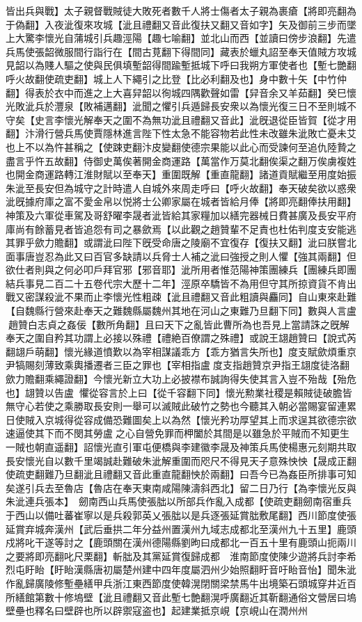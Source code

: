 皆出兵與戰】太子親督戰賊徒大敗死者數千人將士傷者太子親為裹瘡【將即亮翻為于偽翻】入夜泚復來攻城【泚且禮翻又音此復扶又翻又音如字】矢及御前三步而墜上大驚李懷光自蒲城引兵趣涇陽【趣七喻翻】並北山而西【並讀曰傍步浪翻】先遣兵馬使張韶微服間行詣行在【間古莧翻下得間同】藏表於蠟丸詔至奉天值賊方攻城見韶以為賤人驅之使與民俱填塹韶得間踰塹抵城下呼曰我朔方軍使者也【塹七艷翻呼火故翻使疏吏翻】城上人下繩引之比登【比必利翻及也】身中數十矢【中竹仲翻】得表於衣中而進之上大喜舁韶以徇城四隅歡聲如雷【舁音余又羊茹翻】癸巳懷光敗泚兵於灃泉【敗補邁翻】泚聞之懼引兵遁歸長安衆以為懷光復三日不至則城不守矣【史言李懷光解奉天之圍不為無功泚且禮翻又音此】泚旣退從臣皆賀【從才用翻】汴滑行營兵馬使賈隱林進言陛下性太急不能容物若此性未改雖朱泚敗亡憂未艾也上不以為忤甚稱之【使踈吏翻汴皮變翻使德宗果能以此心而受諫何至追仇陸贄之盡言乎忤五故翻】侍御史萬俟著開金商運路【萬當作万莫北翻俟渠之翻万俟虜複姓也開金商運路轉江淮財賦以至奉天】重圍既解【重直龍翻】諸道貢賦繼至用度始振朱泚至長安但為城守之計時遣人自城外來周走呼曰【呼火故翻】奉天破矣欲以惑衆泚旣據府庫之富不愛金帛以悦將士公卿家屬在城者皆給月俸【將即亮翻俸扶用翻】神策及六軍從車駕及哥舒曜李晟者泚皆給其家糧加以繕完器械日費甚廣及長安平府庫尚有餘蓄見者皆追怨有司之暴歛焉【以此觀之趙贊輩不足責也杜佑判度支安能逃其罪乎歛力贍翻】或謂泚曰陛下旣受命唐之陵廟不宜復存【復扶又翻】泚曰朕嘗北面事唐豈忍為此又曰百官多缺請以兵脅士人補之泚曰強授之則人懼【強其兩翻】但欲仕者則與之何必叩戶拜官邪【邪音耶】泚所用者惟范陽神策團練兵【團練兵即團結兵事見二百二十五卷代宗大歷十二年】涇原卒驕皆不為用但守其所掠資貨不肯出戰又密謀殺泚不果而止李懷光性粗疎【泚且禮翻又音此粗讀與麤同】自山東來赴難【自魏縣行營來赴奉天之難魏縣屬魏州其地在河山之東難乃旦翻下同】數與人言盧趙贊白志貞之姦佞【數所角翻】且曰天下之亂皆此曹所為也吾見上當請誅之旣解奉天之圍自矜其功謂上必接以殊禮【禮絶百僚謂之殊禮】或說王翃趙贊曰【說式芮翻翃戶萌翻】懷光緣道憤歎以為宰相謀議乖方【乖方猶言失所也】度支賦歛煩重京尹犒賜刻薄致乘輿播遷者三臣之罪也【宰相指盧度支指趙贊京尹指王翃度徒洛翻歛力贍翻乘繩證翻】今懷光新立大功上必披襟布誠詢得失使其言入豈不殆哉【殆危也】翃贊以告盧懼從容言於上曰【從千容翻下同】懷光勲業社稷是賴賊徒破膽皆無守心若使之乘勝取長安則一舉可以滅賊此破竹之勢也今聽其入朝必當賜宴留連累日使賊入京城得從容成備恐難圖矣上以為然【懷光矜功厚望其上而求逞其欲德宗欲速逼使其下而不閔其勞盧之心自營免罪而柙闔於其間是以雖急於平賊而不知更生一賊也朝直遥翻】詔懷光直引軍屯便橋與李建徽李晟及神策兵馬使楊惠元刻期共取長安懷光自以數千里竭誠赴難破朱泚解重圍而咫尺不得見天子意殊怏怏【晟成正翻使疏吏翻難乃旦翻泚且禮翻又音此重直龍翻怏於兩翻】曰吾今已為姦臣所排事可知矣遂引兵去至魯店【魯店在奉天東南咸陽陳濤斜西北】留二日乃行【為李懷光反與朱泚連兵張本】　劒南西山兵馬使張朏以所部兵作亂入成都【使疏吏翻劒南宿重兵于西山以備吐蕃崔寧以是兵殺郭英乂張朏以是兵逐張延賞朏敷尾翻】西川節度使張延賞弃城奔漢州【武后垂拱二年分益州置漢州九域志成都北至漢州九十五里】鹿頭戍將叱干遂等討之【鹿頭關在漢州德陽縣劉昫曰成都北一百五十里有鹿頭山扼兩川之要將即亮翻叱尺栗翻】斬朏及其黨延賞復歸成都　淮南節度使陳少遊將兵討李希烈屯盱眙【盱眙漢縣唐初屬楚州建中四年度屬泗州少始照翻盱音吁眙音怡】聞朱泚作亂歸廣陵修塹壘繕甲兵浙江東西節度使韓滉閉關梁禁馬牛出境築石頭城穿井近百所繕館第數十修塢壁【泚且禮翻又音此塹七艶翻滉呼廣翻近其靳翻通俗文營居曰塢壁壘也釋名曰壁辟也所以辟禦寇盗也】起建業抵京峴【京峴山在潤州州